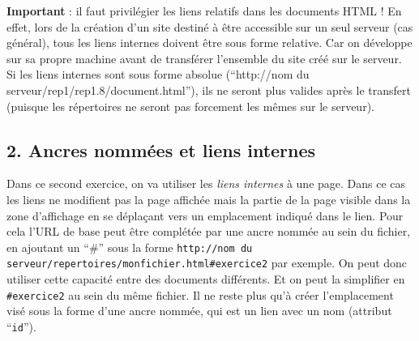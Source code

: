 \documentclass[a4paper,11pt]{article}
\begin{document}
\textcolor{rougetitre}{\textbf{Important}} : il faut privilégier les liens relatifs dans les documents HTML ! En effet, lors de la création d'un site destiné à être accessible sur un seul serveur (cas général), tous les liens internes doivent être sous forme relative. Car on développe sur sa propre machine avant de transférer l'ensemble du site créé sur le serveur. Si les liens internes sont sous forme absolue (``http://nom du serveur/rep1/rep1.8/document.html''), ils ne seront plus valides après le transfert (puisque les répertoires ne seront pas forcement les mêmes sur le serveur).

\subsection{2. Ancres nommées et liens internes}

Dans ce second exercice, on va utiliser les \textit{liens internes} à une page. Dans ce cas les liens ne modifient pas la page affichée mais la partie de la page visible dans la zone d'affichage en se déplaçant vers un emplacement indiqué dans le lien. Pour cela l'URL de base peut être complétée par une ancre nommée au sein du fichier, en ajoutant un ``\#'' sous la forme \texttt{http://nom du serveur/repertoires/monfichier.html\#exercice2} par exemple. On peut donc utiliser cette capacité entre des documents différents. Et on peut la simplifier en \texttt{\#exercice2} au sein du même fichier. Il ne reste plus qu'à créer l'emplacement visé sous la forme d'une ancre nommée, qui est un lien avec un nom (attribut ``\texttt{id}'').
\end{document}
